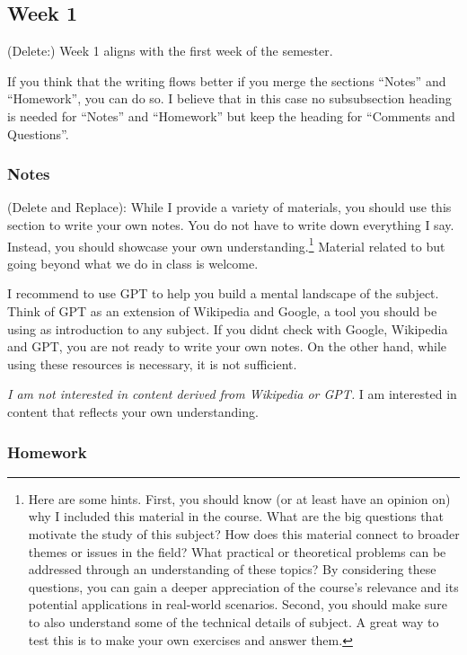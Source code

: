\documentclass{article}
\theoremstyle{theorem}
\theoremstyle{definition}
\theoremstyle{remark}
\begin{document}
\subsection{Week 1}

(Delete:) Week 1 aligns with the first week of the semester. 

If you think that the writing flows better if you merge the sections ``Notes'' and ``Homework'', you can do so. I believe that in this case no subsubsection heading is needed for ``Notes'' and ``Homework'' but keep the heading for ``Comments and Questions''.

\subsubsection*{Notes}

(Delete and Replace): While I provide a variety of materials, you should use this section to write your own notes. You do not have to write down everything I say. Instead, you should showcase your own understanding.\footnote{Here are some hints. First, you should know (or at least have an opinion on) why I included this material in the course. What are the big questions that motivate the study of this subject? How does this material connect to broader themes or issues in the field? What practical or theoretical problems can be addressed through an understanding of these topics? By considering these questions, you can gain a deeper appreciation of the course's relevance and its potential applications in real-world scenarios. Second, you should make sure to also understand some of the technical details of subject. A great way to test this is to make your own exercises and answer them.} Material related to but going beyond what we do in class is welcome.

I recommend to use GPT to help you build a mental landscape of the subject. Think of GPT as an extension of Wikipedia and Google, a tool you should be using as introduction to any subject. If you didnt check with Google, Wikipedia and GPT, you are not ready to write your own notes. On the other hand, while using these resources is necessary, it is not sufficient. 

\emph{I am not interested in content derived from Wikipedia or GPT.} I am interested in content that reflects your own understanding.

\subsubsection*{Homework}
\end{document}

